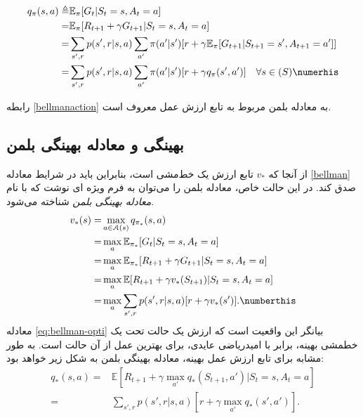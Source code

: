 \begin{align}
q_\pi (s,a) \triangleq& \mathbb{E}_\pi [G_t | S_t = s, A_t = a] \nonumber \\
=& \mathbb{E}_\pi [R_{t+1}+ \gamma G_{t+1}|S_t=s, A_t = a] \nonumber \\
=&\sum_{s',r} p(s',r|s,a) \sum_{a'} \pi(a'|s')[r+\gamma \mathbb{E}_\pi[G_{t+1}|S_{t+1}=s', A_{t+1} = a']] \nonumber\\
=&\sum_{s',r}  p(s',r|s,a) \sum_{a'} \pi(a'|s')[r+\gamma q_\pi(s',a')] \quad \forall s \in \mathbb(S) \numerhis 
\label{bellmanaction}
\end{align}

رابطه \ref{bellmanaction} به معادله بلمن مربوط به تابع ارزش عمل معروف است.
\subsection{بهینگی و معادله بهینگی بلمن}

از آنجا که $v_*$ تابع ارزش یک خط‌مشی است، بنابراین باید در شرایط معادله \ref{bellman} صدق کند.
در این حالت خاص، معادله بلمن را می‌توان به فرم ویژه ای نوشت که با نام
 \textit{معادله بهینگی بلمن}
شناخته می‌شود.
\begin{align}
  v_{*}(s)= &\max_{a \in \EuScript{A}(s)} q_{\pi_*}(s,a) \nonumber \\
      =& \max_{a} \mathbb{E}_{\pi_*} [G_t|S_t=s, A_t=a] \nonumber \\ 
      =& \max_{a} \mathbb{E}_{\pi_*} [R_{t+1} + \gamma G_{t+1} | S_t=s, A_t=a] \nonumber \\ 
      =& \max_{a} \mathbb{E} [R_{t+1} + \gamma v_*(S_{t+1}) | S_t= s, A_t = a] \nonumber \\
      =& \max_{a} \sum_{s',r} p(s',r|s,a) [r + \gamma v_*(s')]. \numberthis
\label{eq:bellman-opti}
\end{align}
معادله 
\ref{eq:bellman-opti}
 بیانگر این واقعیت است که ارزش یک حالت تحت یک خط\nf مشی بهینه، برابر با امیدریاضی عایدی، برای بهترین عمل از آن حالت است. به طور مشابه برای تابع ارزش عمل بهینه، معادله بهینگی بلمن به شکل زیر خواهد بود:
\begin{align}
q_*(s,a) =& \mathbb{E}\left[R_{t+1} + \gamma \max_{a'} q_*(S_{t+1},a')| S_t=s, A_t=a \right] \nonumber\\
=& \sum_{s',r} p(s',r|s,a) \left[r + \gamma \max_{a'} q_*(s',a')\right] 
\label{eq:2}.
\end{align}


